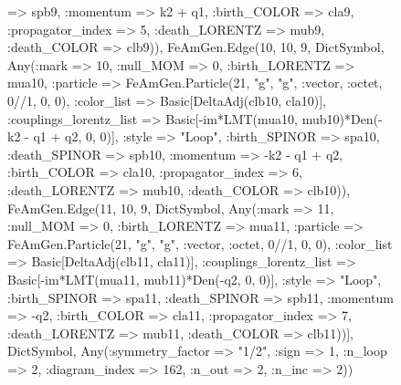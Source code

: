 \documentclass{revtex4}
\begin{document}
\begin{figure}[!htb]
\begin{center}
{=> spb9, :momentum => k2 + q1, :birth_COLOR => cla9, :propagator_index => 5, :death_LORENTZ => mub9, :death_COLOR => clb9)), FeAmGen.Edge(10, 10, 9, Dict{Symbol, Any}(:mark => 10, :null_MOM => 0, :birth_LORENTZ => mua10, :particle => FeAmGen.Particle(21, "g", "g", :vector, :octet, 0//1, 0, 0), :color_list => Basic[DeltaAdj(clb10, cla10)], :couplings_lorentz_list => Basic[-im*LMT(mua10, mub10)*Den(-k2 - q1 + q2, 0, 0)], :style => "Loop", :birth_SPINOR => spa10, :death_SPINOR => spb10, :momentum => -k2 - q1 + q2, :birth_COLOR => cla10, :propagator_index => 6, :death_LORENTZ => mub10, :death_COLOR => clb10)), FeAmGen.Edge(11, 10, 9, Dict{Symbol, Any}(:mark => 11, :null_MOM => 0, :birth_LORENTZ => mua11, :particle => FeAmGen.Particle(21, "g", "g", :vector, :octet, 0//1, 0, 0), :color_list => Basic[DeltaAdj(clb11, cla11)], :couplings_lorentz_list => Basic[-im*LMT(mua11, mub11)*Den(-q2, 0, 0)], :style => "Loop", :birth_SPINOR => spa11, :death_SPINOR => spb11, :momentum => -q2, :birth_COLOR => cla11, :propagator_index => 7, :death_LORENTZ => mub11, :death_COLOR => clb11))], Dict{Symbol, Any}(:symmetry_factor => "1/2", :sign => 1, :n_loop => 2, :diagram_index => 162, :n_out => 2, :n_inc => 2)) 
}
\end{center}
\end{figure}
\end{document}
